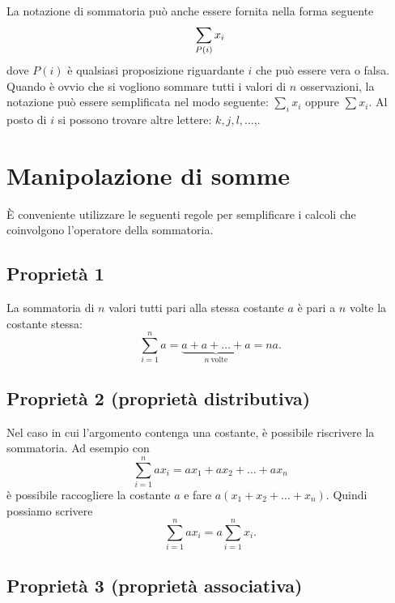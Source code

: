 \documentclass[
]{memoir}
\theoremstyle{definition}
\theoremstyle{definition}
\theoremstyle{definition}
\theoremstyle{definition}
\theoremstyle{remark}
\begin{document}
La notazione di sommatoria può anche essere fornita nella forma seguente
\begin{equation}
  \sum_{P(i)} x_i\notag
\end{equation}
dove \(P(i)\) è qualsiasi proposizione riguardante \(i\) che può essere vera o falsa. Quando è ovvio che si vogliono sommare tutti i valori di \(n\) osservazioni, la notazione può essere semplificata nel modo seguente: \(\sum_{i} x_i\) oppure \(\sum x_i\). Al posto di \(i\) si possono trovare altre lettere: \(k, j, l, \dots\),.

\hypertarget{manipolazione-di-somme}{%
\section{Manipolazione di somme}\label{manipolazione-di-somme}}

È conveniente utilizzare le seguenti regole per semplificare i calcoli che coinvolgono l'operatore della sommatoria.

\hypertarget{proprietuxe0-1}{%
\subsection{Proprietà 1}\label{proprietuxe0-1}}

La sommatoria di \(n\) valori tutti pari alla stessa costante \(a\) è pari a \(n\) volte la costante stessa:
\[
  \sum_{i=1}^{n} a =  \underbrace{a + a + \dots + a}_{n~\text{volte}} = n a.
  \]

\hypertarget{proprietuxe0-2-proprietuxe0-distributiva}{%
\subsection{Proprietà 2 (proprietà distributiva)}\label{proprietuxe0-2-proprietuxe0-distributiva}}

Nel caso in cui l'argomento contenga una costante, è possibile riscrivere la sommatoria. Ad esempio con
\[
  \sum_{i=1}^{n} a x_i =  a x_1 + a x_2 + \dots + a x_n
  \]
è possibile raccogliere la costante \(a\) e fare \(a(x_1 +x_2 + \dots + x_n)\). Quindi possiamo scrivere
\[
  \sum_{i=1}^{n} a x_i =  a  \sum_{i=1}^{n} x_i.
  \]

\hypertarget{proprietuxe0-3-proprietuxe0-associativa}{%
\subsection{Proprietà 3 (proprietà associativa)}\label{proprietuxe0-3-proprietuxe0-associativa}}
\end{document}
